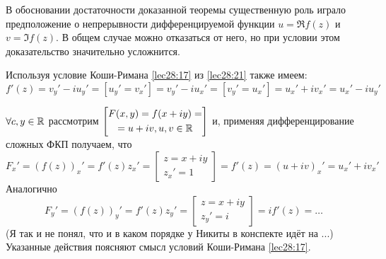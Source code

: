 \documentclass[../../main.tex]{subfiles}
\begin{document}
	
\begin{rems}
	\item В обосновании достаточности доказанной теоремы существенную роль 
	играло предположение о непрерывности дифференцируемой функции 
	$ u = \Re f(z) $ и $ v = \Im f(z) $. В общем случае  можно отказаться 
	от него, но при условии этом доказательство значительно усложнится.
	\item Используя условие Коши-Римана \eqref{lec28:17} из \eqref{lec28:21} также имеем:
	\begin{equation}
	\label{lec29:22} 
	f'(z) = v_y' - iu_y' = \left[u_y' = v_x'\right] =
	v_y' - iu_x' = \left[v_y' = u_x'\right] = u_x' + iv_x' = u_x' - iu_y'
	\end{equation}
	\item $ \forall c, y \in \mathbb{R} $ рассмотрим 
	$ \left[\begin{gathered}
		F(x, y) = f(x + iy) =\\
		=u + iv, u, v \in \mathbb{R}
	\end{gathered}\right] $ 
	и, применяя дифференцирование сложных ФКП получаем, что 
	\[ 
	F_x' = (f(z))_x' = f'(z)z_x' = \left[
	\begin{gathered}
		z = x + iy\\
		z_x' = 1
	\end{gathered}
	\right] = f'(z) = (u + iv)_x' = u_x' + iv_x'
	\]
	Аналогично
	\[ 
	F_y' = (f(z))_y' = f'(z)z_y' = \left[
	\begin{gathered}
	z = x + iy\\
	z_y' = i
	\end{gathered}
	\right] = if'(z) = \dots
	\]
	(Я так и не понял, что и в каком порядке у Никиты в конспекте идёт на ...)
	Указанные действия поясняют смысл условий Коши-Римана \eqref{lec28:17}.
\end{rems}
\end{document}
